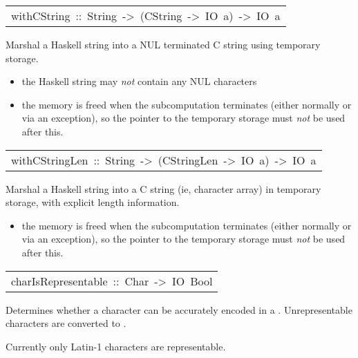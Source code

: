 \begin{haddockdesc}
\item[\begin{tabular}{@{}l}
withCString\ ::\ String\ ->\ (CString\ ->\ IO\ a)\ ->\ IO\ a
\end{tabular}]\haddockbegindoc
Marshal a Haskell string into a NUL terminated C string using temporary
 storage.
\par
\begin{itemize}
\item
 the Haskell string may \emph{not} contain any NUL characters
\par

\item
 the memory is freed when the subcomputation terminates (either
   normally or via an exception), so the pointer to the temporary
   storage must \emph{not} be used after this.
\par

\end{itemize}

\end{haddockdesc}
\begin{haddockdesc}
\item[\begin{tabular}{@{}l}
withCStringLen\ ::\ String\ ->\ (CStringLen\ ->\ IO\ a)\ ->\ IO\ a
\end{tabular}]\haddockbegindoc
Marshal a Haskell string into a C string (ie, character array)
 in temporary storage, with explicit length information.
\par
\begin{itemize}
\item
 the memory is freed when the subcomputation terminates (either
   normally or via an exception), so the pointer to the temporary
   storage must \emph{not} be used after this.
\par

\end{itemize}

\end{haddockdesc}
\begin{haddockdesc}
\item[\begin{tabular}{@{}l}
charIsRepresentable\ ::\ Char\ ->\ IO\ Bool
\end{tabular}]\haddockbegindoc
Determines whether a character can be accurately encoded in a .
 Unrepresentable characters are converted to .
\par
Currently only Latin-1 characters are representable.
\par

\end{haddockdesc}
